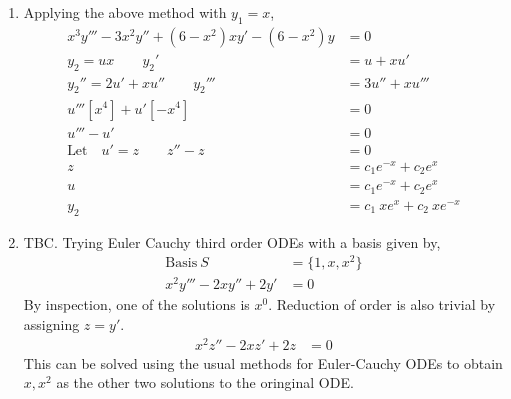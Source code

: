\begin{enumerate}
\begin{enumerate}
              \item Applying the above method with $ y_{1} = x $,
                    \begin{align}
                        x^{3}y''' - 3x^{2}y'' + (6 - x^{2})xy' - (6 - x^{2})y & = 0                              \\
                        y_{2} = ux \qquad y_{2}'                              & = u + xu'                        \\
                        y_{2}'' =2u' + xu'' \qquad y_{2}'''                   & = 3u'' + xu'''                   \\
                        u'''[x^{4}] + u'[-x^{4}]                              & = 0                              \\
                        u''' - u'                                             & = 0                              \\
                        \text{Let} \quad u' = z \qquad z'' - z                & = 0                              \\
                        z                                                     & = c_{1}e^{-x} + c_{2}e^{x}       \\
                        u                                                     & = c_{1}e^{-x} + c_{2}e^{x}       \\
                        y_{2}                                                 & = c_{1}\ xe^{x} + c_{2}\ xe^{-x}
                    \end{align}

              \item TBC. Trying Euler Cauchy third order ODEs with a basis given by,
                    \begin{align}
                        \text{Basis}\ S         & = \{1, x, x^{2}\} \\
                        x^{2}y''' - 2xy'' + 2y' & = 0
                    \end{align}
                    By inspection, one of the solutions is $ x^{0} $. Reduction of order is also
                    trivial by assigning $ z = y' $.
                    \begin{align}
                        x^{2}z'' - 2xz' + 2z & = 0
                    \end{align}
                    This can be solved using the usual methods for Euler-Cauchy ODEs to
                    obtain $ x, x^{2} $ as the other two solutions to the oringinal ODE.
          \end{enumerate}

\end{enumerate}
